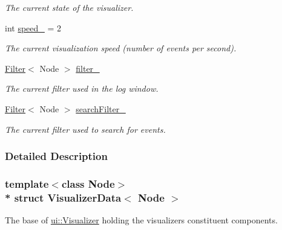 \begin{DoxyCompactItemize}
\begin{DoxyCompactList}\small\item\em The current state of the visualizer. \end{DoxyCompactList}\item 
int \hyperlink{structVisualizerData_a961eaa14c1b42e9202f6981282bbe7eb}{speed\+\_\+} = 2\hypertarget{structVisualizerData_a961eaa14c1b42e9202f6981282bbe7eb}{}\label{structVisualizerData_a961eaa14c1b42e9202f6981282bbe7eb}

\begin{DoxyCompactList}\small\item\em The current visualization speed (number of events per second). \end{DoxyCompactList}\item 
\hyperlink{structFilter}{Filter}$<$ Node $>$ \hyperlink{structVisualizerData_aabef0acaf0ce5051b313bbfe3ad2f2b0}{filter\+\_\+}\hypertarget{structVisualizerData_aabef0acaf0ce5051b313bbfe3ad2f2b0}{}\label{structVisualizerData_aabef0acaf0ce5051b313bbfe3ad2f2b0}

\begin{DoxyCompactList}\small\item\em The current filter used in the log window. \end{DoxyCompactList}\item 
\hyperlink{structFilter}{Filter}$<$ Node $>$ \hyperlink{structVisualizerData_a041bc47895f64b81f824b3e053ab2030}{search\+Filter\+\_\+}\hypertarget{structVisualizerData_a041bc47895f64b81f824b3e053ab2030}{}\label{structVisualizerData_a041bc47895f64b81f824b3e053ab2030}

\begin{DoxyCompactList}\small\item\em The current filter used to search for events. \end{DoxyCompactList}\end{DoxyCompactItemize}


\subsubsection{Detailed Description}
\subsubsection*{template$<$class Node$>$\\*
struct Visualizer\+Data$<$ Node $>$}

The base of \hyperlink{structui_1_1Visualizer}{ui\+::\+Visualizer} holding the visualizer\textquotesingle{}s constituent components. 

